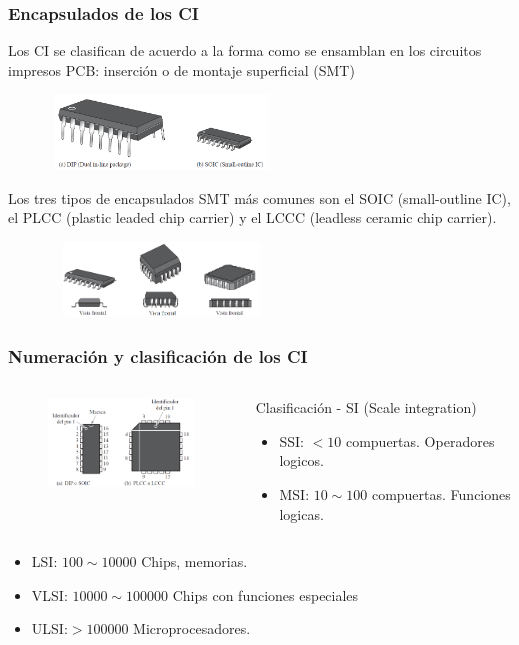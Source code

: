 \documentclass[10.5pt,scale=1.0,t,aspectratio=169,hyperref={pdfpagelabels=false}]{beamer}
\begin{document}
\begin{frame}
	\frametitle{Encapsulados de los CI}
	Los CI se clasifican de acuerdo a la forma como se ensamblan en los circuitos impresos PCB: inserción o de montaje superficial (SMT)
\begin{figure}
	\centering
	\includegraphics[width=6cm,height=2cm]{TipoIC}
\end{figure}
Los tres tipos de encapsulados SMT más comunes son el SOIC (small-outline IC), el PLCC (plastic leaded chip carrier) y el LCCC (leadless ceramic chip carrier).
\begin{figure}
	\centering
	\includegraphics[width=6cm,height=2cm]{SMTClasificacion}
\end{figure}
\end{frame}

\begin{frame}
	\frametitle{Numeración y clasificación de los CI}
	\begin{columns}
	\begin{block}
		\justifying
		\vspace{-0.3in}
		\begin{figure}
			\centering
			\includegraphics[width=5cm]{NumeracionPines}
		\end{figure}
	\end{block}
	
	\column{0.5\linewidth}
	\begin{block}{\small Clasificación - SI (Scale integration)}
		\justifying
		\small
		\begin{itemize}
			\item SSI: $< 10$ compuertas. Operadores logicos.
			\item MSI: $10 \sim 100$ compuertas. Funciones logicas.
		\end{itemize}
	\end{block}
\end{columns}
\begin{itemize}
	\item LSI: $100 \sim 10000$ Chips, memorias.
	\item VLSI: $10000 \sim 100000$ Chips con funciones especiales
	\item ULSI:$>100000$ Microprocesadores.
\end{itemize}
\end{frame}
\end{document}
